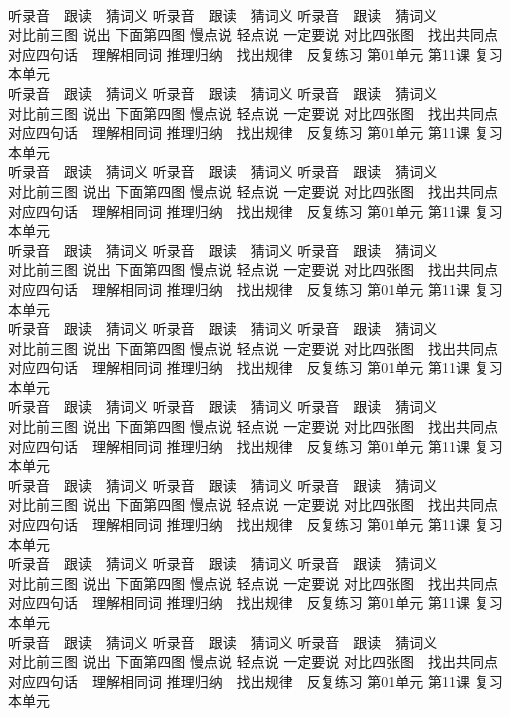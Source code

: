 \documentclass[8pt]{extreport}
\begin{document}
\begin{CJK}{UTF8}{min}
\\	听录音　跟读　猜词义 听录音　跟读　猜词义 听录音　跟读　猜词义 
\\	对比前三图 说出 下面第四图 慢点说 轻点说 一定要说	对比四张图　找出共同点 对应四句话　理解相同词 推理归纳　找出规律　反复练习 第01单元 第11课 复习本单元
\\	听录音　跟读　猜词义 听录音　跟读　猜词义 听录音　跟读　猜词义 
\\	对比前三图 说出 下面第四图 慢点说 轻点说 一定要说	对比四张图　找出共同点 对应四句话　理解相同词 推理归纳　找出规律　反复练习 第01单元 第11课 复习本单元
\\	听录音　跟读　猜词义 听录音　跟读　猜词义 听录音　跟读　猜词义 
\\	对比前三图 说出 下面第四图 慢点说 轻点说 一定要说	对比四张图　找出共同点 对应四句话　理解相同词 推理归纳　找出规律　反复练习 第01单元 第11课 复习本单元
\\	听录音　跟读　猜词义 听录音　跟读　猜词义 听录音　跟读　猜词义 
\\	对比前三图 说出 下面第四图 慢点说 轻点说 一定要说	对比四张图　找出共同点 对应四句话　理解相同词 推理归纳　找出规律　反复练习 第01单元 第11课 复习本单元
\\	听录音　跟读　猜词义 听录音　跟读　猜词义 听录音　跟读　猜词义 
\\	对比前三图 说出 下面第四图 慢点说 轻点说 一定要说	对比四张图　找出共同点 对应四句话　理解相同词 推理归纳　找出规律　反复练习 第01单元 第11课 复习本单元
\\	听录音　跟读　猜词义 听录音　跟读　猜词义 听录音　跟读　猜词义 
\\	对比前三图 说出 下面第四图 慢点说 轻点说 一定要说	对比四张图　找出共同点 对应四句话　理解相同词 推理归纳　找出规律　反复练习 第01单元 第11课 复习本单元
\\	听录音　跟读　猜词义 听录音　跟读　猜词义 听录音　跟读　猜词义 
\\	对比前三图 说出 下面第四图 慢点说 轻点说 一定要说	对比四张图　找出共同点 对应四句话　理解相同词 推理归纳　找出规律　反复练习 第01单元 第11课 复习本单元
\\	听录音　跟读　猜词义 听录音　跟读　猜词义 听录音　跟读　猜词义 
\\	对比前三图 说出 下面第四图 慢点说 轻点说 一定要说	对比四张图　找出共同点 对应四句话　理解相同词 推理归纳　找出规律　反复练习 第01单元 第11课 复习本单元
\\	听录音　跟读　猜词义 听录音　跟读　猜词义 听录音　跟读　猜词义 
\\	对比前三图 说出 下面第四图 慢点说 轻点说 一定要说	对比四张图　找出共同点 对应四句话　理解相同词 推理归纳　找出规律　反复练习 第01单元 第11课 复习本单元

\end{CJK}
\end{document}
